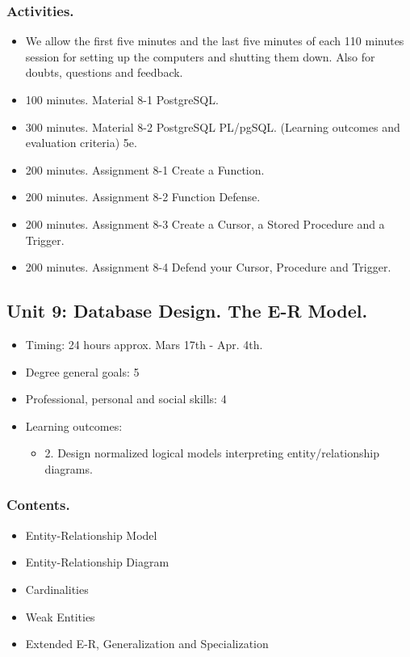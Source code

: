\documentclass[catalan, a4paper, 12pt, titlepage]{article}
\begin{document}
  \subsubsection{Activities.}
  \begin{itemize}
          \item We allow the first five minutes and the last five minutes of each 110 minutes session for setting up the computers and shutting them down. Also for doubts, questions and feedback.
	  \item 100 minutes. Material 8-1 PostgreSQL.
	  \item 300 minutes. Material 8-2 PostgreSQL PL/pgSQL. (\faGraduationCap Learning outcomes and evaluation criteria) 5e.
	  \item 200 minutes. Assignment 8-1 Create a Function.
	  \item 200 minutes. Assignment 8-2 Function Defense.
	  \item 200 minutes. Assignment 8-3 Create a Cursor, a Stored Procedure and a Trigger.
	  \item 200 minutes. Assignment 8-4 Defend your Cursor, Procedure and Trigger.
  \end{itemize}

  \subsection{Unit 9: Database Design. The E-R Model.}

  \begin{itemize}
	\item Timing: 24 hours approx. Mars 17th - Apr. 4th.
	\item Degree general goals: 5
	\item Professional, personal and social skills: 4
	\item Learning outcomes: 
		\begin{itemize}
			\item 2. Design normalized logical models interpreting entity/relationship diagrams.
		\end{itemize}
  \end{itemize}

  \subsubsection{Contents.}
  \begin{itemize}
	  \item Entity-Relationship Model
	  \item Entity-Relationship Diagram
	  \item Cardinalities
	  \item Weak Entities
	  \item Extended E-R, Generalization and Specialization
  \end{itemize}
\end{document}
